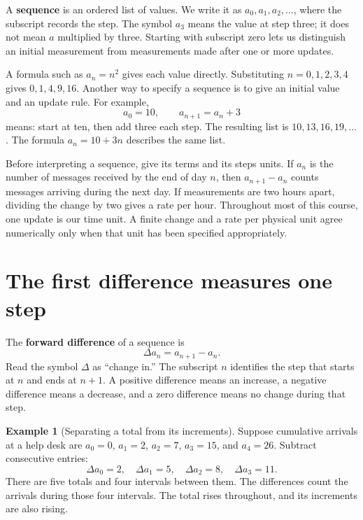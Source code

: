 \documentclass[11pt,oneside,openany]{book}
\theoremstyle{definition}
\newtheorem{example}{Example}[chapter]
\theoremstyle{remark}
\numberwithin{equation}{chapter}
\begin{document}
A \textbf{sequence} is an ordered list of values. We write it as \(a_0,a_1,a_2,\ldots\), where the subscript records the step. The symbol \(a_3\) means the value at step three; it does not mean \(a\) multiplied by three. Starting with subscript zero lets us distinguish an initial measurement from measurements made after one or more updates.

A formula such as \(a_n=n^2\) gives each value directly. Substituting \(n=0,1,2,3,4\) gives \(0,1,4,9,16\). Another way to specify a sequence is to give an initial value and an update rule. For example, \[a_0=10,\qquad a_{n+1}=a_n+3\] means: start at ten, then add three each step. The resulting list is \(10,13,16,19,\ldots\). The formula \(a_n=10+3n\) describes the same list.

Before interpreting a sequence, give its terms and its steps units. If \(a_n\) is the number of messages received by the end of day \(n\), then \(a_{n+1}-a_n\) counts messages arriving during the next day. If measurements are two hours apart, dividing the change by two gives a rate per hour. Throughout most of this course, one update is our time unit. A finite change and a rate per physical unit agree numerically only when that unit has been specified appropriately.

\section{The first difference measures one step}\label{ch01-the-first-difference-measures-one-step}

The \textbf{forward difference} of a sequence is \[\boxed{\Delta a_n=a_{n+1}-a_n.}\] Read the symbol \(\Delta\) as ``change in.'' The subscript \(n\) identifies the step that starts at \(n\) and ends at \(n+1\). A positive difference means an increase, a negative difference means a decrease, and a zero difference means no change during that step.

\begin{example}[Separating a total from its increments]

Suppose cumulative arrivals at a help desk are \(a_0=0\), \(a_1=2\), \(a_2=7\), \(a_3=15\), and \(a_4=26\). Subtract consecutive entries: \[\Delta a_0=2,\quad\Delta a_1=5,\quad\Delta a_2=8,\quad\Delta a_3=11.\] There are five totals and four intervals between them. The differences count the arrivals during those four intervals. The total rises throughout, and its increments are also rising.

\end{example}
\end{document}
